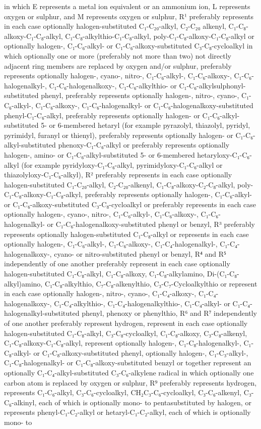 \documentclass[11pt,a4paper]{article}
\begin{document}
in which E represents a metal ion equivalent or an ammonium ion, L represents oxygen or sulphur, and M represents oxygen or sulphur, R¹ preferably represents in each case optionally halogen-substituted C₁-C₂₀-alkyl, C₂-C₂₀ alkenyl, C₁-C₈-alkoxy-C₁-C₈-alkyl, C₁-C₈-alkylthio-C₁-C₈-alkyl, poly-C₁-C₈-alkoxy-C₁-C₈-alkyl or optionally halogen-, C₁-C₆-alkyl- or C₁-C₆-alkoxy-substituted C₃-C₈-cycloalkyl in which optionally one or more (preferably not more than two) not directly adjacent ring members are replaced by oxygen and/or sulphur, preferably represents optionally halogen-, cyano-, nitro-, C₁-C₆-alkyl-, C₁-C₆-alkoxy-, C₁-C₆-halogenalkyl-, C₁-C₆-halogenalkoxy-, C₁-C₆-alkylthio- or C₁-C₆-alkylsulphonyl-substituted phenyl, preferably represents optionally halogen-, nitro-, cyano-, C₁-C₆-alkyl-, C₁-C₆-alkoxy-, C₁-C₆-halogenalkyl- or C₁-C₆-halogenalkoxy-substituted phenyl-C₁-C₆-alkyl, preferably represents optionally halogen- or C₁-C₆-alkyl-substituted 5- or 6-membered hetaryl (for example pyrazolyl, thiazolyl, pyridyl, pyrimidyl, furanyl or thienyl), preferably represents optionally halogen- or C₁-C₆-alkyl-substituted phenoxy-C₁-C₆-alkyl or preferably represents optionally halogen-, amino- or C₁-C₆-alkyl-substituted 5- or 6-membered hetaryloxy-C₁-C₆-alkyl (for example pyridyloxy-C₁-C₆-alkyl, pyrimidyloxy-C₁-C₆-alkyl or thiazolyloxy-C₁-C₆-alkyl), R² preferably represents in each case optionally halogen-substituted C₁-C₂₀-alkyl, C₂-C₂₀-alkenyl, C₁-C₈-alkoxy-C₂-C₈-alkyl, poly-C₁-C₈-alkoxy-C₁-C₈-alkyl, preferably represents optionally halogen-, C₁-C₆-alkyl- or C₁-C₆-alkoxy-substituted C₃-C₈-cycloalkyl or preferably represents in each case optionally halogen-, cyano-, nitro-, C₁-C₆-alkyl-, C₁-C₆-alkoxy-, C₁-C₆-halogenalkyl- or C₁-C₆-halogenalkoxy-substituted phenyl or benzyl, R³ preferably represents optionally halogen-substituted C₁-C₈-alkyl or represents in each case optionally halogen-, C₁-C₆-alkyl-, C₁-C₆-alkoxy-, C₁-C₄-halogenalkyl-, C₁-C₄-halogenalkoxy-, cyano- or nitro-substituted phenyl or benzyl, R⁴ and R⁵ independently of one another preferably represent in each case optionally halogen-substituted C₁-C₈-alkyl, C₁-C₈-alkoxy, C₁-C₈-alkylamino, Di-(C₁-C₈-alkyl)amino, C₁-C₈-alkylthio, C₇-C₈-alkenylthio, C₃-C₇-Cycloalkylthio or represent in each case optionally halogen-, nitro-, cyano-, C₁-C₄-alkoxy-, C₁-C₄-halogenalkoxy-, C₁-C₄-alkylthio-, C₁-C₄-halogenalkylthio-, C₁-C₄-alkyl- or C₁-C₄-halogenalkyl-substituted phenyl, phenoxy or phenylthio, R⁶ and R⁷ independently of one another preferably represent hydrogen, represent in each case optionally halogen-substituted C₁-C₈-alkyl, C₃-C₈-cycloalkyl, C₁-C₈-alkoxy, C₃-C₈-alkenyl, C₁-C₈-alkoxy-C₁-C₈-alkyl, represent optionally halogen-, C₁-C₈-halogenalkyl-, C₁-C₈-alkyl- or C₁-C₈-alkoxy-substituted phenyl, optionally halogen-, C₁-C₃-alkyl-, C₁-C₈-halogenalkyl- or C₁-C₈-alkoxy-substituted benzyl or together represent an optionally C₁-C₄-alkyl-substituted C₃-C₆-alkylene radical in which optionally one carbon atom is replaced by oxygen or sulphur, R⁹ preferably represents hydrogen, represents C₁-C₆-alkyl, C₃-C₆-cycloalkyl, CH₂C₃-C₆-cycloalkyl, C₃-C₆-alkenyl, C₃-C₆-alkinyl, each of which is optionally mono- to pentasubstituted by halogen, or represents phenyl-C₁-C₂-alkyl or hetaryl-C₁-C₂-alkyl, each of which is optionally mono- to 
\end{document}
